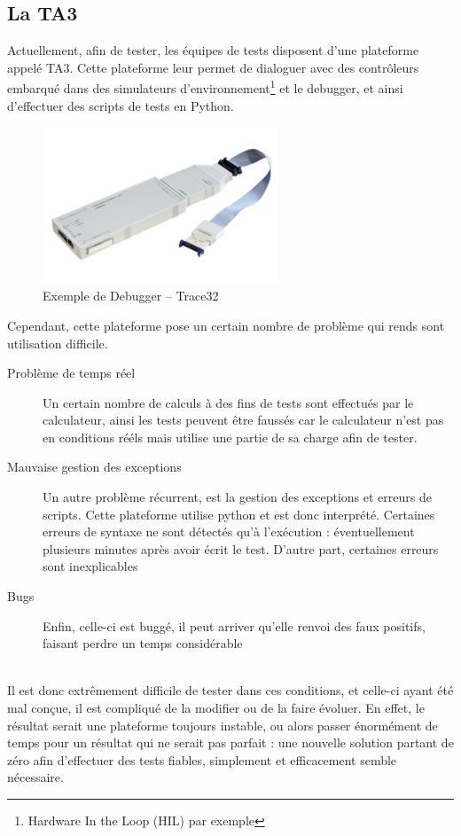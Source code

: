 	\subsection{La TA3}
	Actuellement, afin de tester, les équipes de tests disposent d'une plateforme appelé TA3. Cette plateforme leur permet de dialoguer avec des contrôleurs embarqué dans des simulateurs d'environnement\footnote{Hardware In the Loop (HIL) par exemple} et le debugger, et ainsi d'effectuer des scripts de tests en Python.
	\begin{figure}[H]		
		\centering
		\includegraphics[width=7cm]{contents/images/trace32.png}
		\caption{Exemple de Debugger -- Trace32}
		\label{fig:photoHil}
	\end{figure}

	Cependant, cette plateforme pose un certain nombre de problème qui rends sont utilisation difficile.
	\begin{description}
		\item[Problème de temps réel] Un certain nombre de calculs à des fins de tests sont effectués par le calculateur, ainsi les tests peuvent être faussés car le calculateur n'est pas en conditions rééls mais utilise une partie de sa charge afin de tester.
		\item[Mauvaise gestion des exceptions] Un autre problème récurrent, est la gestion des exceptions et erreurs de scripts. Cette plateforme utilise python et est donc interprété. Certaines erreurs de syntaxe ne sont détectés qu'à l'exécution : éventuellement plusieurs minutes après avoir écrit le test. D'autre part, certaines erreurs sont inexplicables
		\item[Bugs] Enfin, celle-ci est buggé, il peut arriver qu'elle renvoi des faux positifs, faisant perdre un temps considérable
	\end{description}
~\\
	Il est donc extrêmement difficile de tester dans ces conditions, et celle-ci ayant été mal conçue, il est compliqué de la modifier ou de la faire évoluer. En effet, le résultat serait une plateforme toujours instable, ou alors passer énormément de temps pour un résultat qui ne serait pas parfait : une nouvelle solution partant de zéro afin d'effectuer des tests fiables, simplement et efficacement semble nécessaire.

